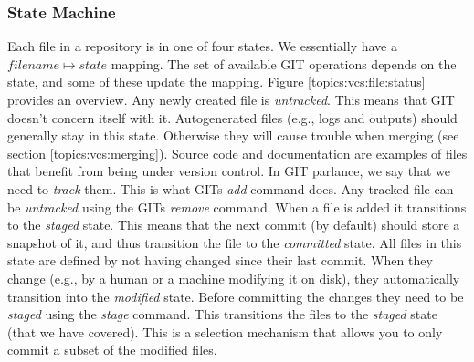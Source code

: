 \subsubsection{State Machine}

Each file in a repository is in one of four states. We essentially have a $filename \mapsto state$ mapping. The set of available GIT operations depends on the state, and some of these update the mapping. Figure \ref{topics:vcs:file:status} provides an overview. Any newly created file is \textsl{untracked}. This means that GIT doesn't concern itself with it. Autogenerated files (e.g., logs and outputs) should generally stay in this state. Otherwise they will cause trouble when merging (see section \ref{topics:vcs:merging}). Source code and documentation are examples of files that benefit from being under version control. In GIT parlance, we say that we need to \textsl{track} them. This is what GITs \textsl{add} command does. Any tracked file can be \textsl{untracked} using the GITs \textsl{remove} command. When a file is added it transitions to the \textsl{staged} state. This means that the next commit (by default) should store a snapshot of it, and thus transition the file to the \textsl{committed} state. All files in this state are defined by not having changed since their last commit. When they change (e.g., by a human or a machine modifying it on disk), they automatically transition into the \textsl{modified} state. Before committing the changes they need to be \textsl{staged} using the \textsl{stage} command. This transitions the files to the \textsl{staged} state (that we have covered). This is a selection mechanism that allows you to only commit a subset of the modified files.

